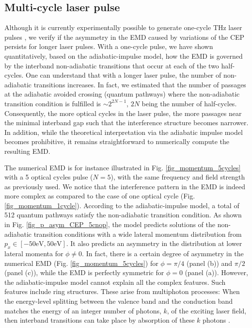\documentclass[9pt,twocolumn,twoside]{osajnl}
\begin{document}

\subsection{Multi-cycle laser pulse}

Although it is currently experimentally possible to generate one-cycle THz laser pulses \cite{Blanchard:07}, we verify if the asymmetry in the EMD caused by variations of the CEP persists for longer laser pulses. 
With a one-cycle pulse, we have shown quantitatively, based on the adiabatic-impulse model, how the EMD is governed by the interband non-adiabatic transitions that occur at each of the two half-cycles. One can understand that with a longer laser pulse, the number of non-adiabatic transitions increases. In fact, we estimated that the number of passages at the adiabatic avoided crossing (quantum pathways) where the non-adiabatic transition condition is fulfilled is $ \sim 2^{2N-1}$, $2N$ being the number of half-cycles. Consequently, the more optical cycles in the laser pulse, the more passages near the minimal interband gap such that  
the interference structure becomes narrower. In addition, while the theoretical interpretation via the adiabatic impulse model becomes prohibitive, it remains straightforward to numerically compute the resulting EMD.  

The numerical EMD is for instance illustrated in Fig. \ref{fig_momentum_5cycles} with a 5 optical cycles pulse ($N=5$), with the same frequency and field strength as previously used.  
 We notice that the interference pattern in the EMD is indeed more complex as compared to the case of one optical cycle (Fig. \ref{fig_momentum_1cycle}).  According to the adiabatic-impulse model, a total of 512 quantum pathways satisfy the non-adiabatic transition condition. As shown in Fig. \ref{fig_p_asym_CEP_5cnop}, the model predicts solutions of the non-adiabatic transition conditions with a wide lateral momentum distribution from $p_x \in [-50\mathrm{eV},50\mathrm{eV}]$. It also predicts an asymmetry in the distribution at lower lateral momenta for $\phi\ne0$. 
In fact, there is a certain degree of asymmetry in the numerical EMD (Fig. \ref{fig_momentum_5cycles}) for $\phi=\pi/4$ (panel (b)) and $\pi/2$ (panel (c)), while the EMD is perfectly symmetric for $\phi=0$ (panel (a)). 
However, the adiabatic-impulse model  cannot explain all the complex features.
%
Such features include ring structures. These arise from multiphoton processes: When the energy-level splitting between the valence band and the conduction band matches the energy of an integer number of photons, $k$, of the exciting laser field, then interband transitions can take place by absorption of these $k$ photons \cite{PhysRevB.94.125423,0953-8984-29-3-035501,Gagnon2017}.  
\end{document}
